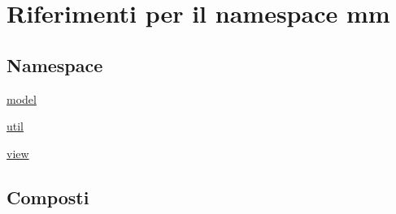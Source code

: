 \hypertarget{namespacemm}{}\section{Riferimenti per il namespace mm}
\label{namespacemm}
\subsection*{Namespace}
\begin{DoxyCompactItemize}
\item 
 \hyperlink{namespacemm_1_1model}{model}
\item 
 \hyperlink{namespacemm_1_1util}{util}
\item 
 \hyperlink{namespacemm_1_1view}{view}
\end{DoxyCompactItemize}
\subsection*{Composti}

